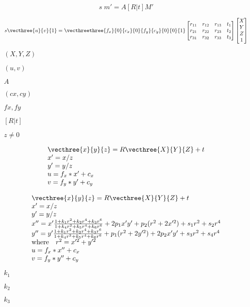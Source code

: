 \documentclass{article}
\begin{document}
\[s \; m' = A [R|t] M'\]
\pagebreak

\[s \vecthree{u}{v}{1} = \vecthreethree{f_x}{0}{c_x}{0}{f_y}{c_y}{0}{0}{1} \begin{bmatrix} r_{11} & r_{12} & r_{13} & t_1 \\ r_{21} & r_{22} & r_{23} & t_2 \\ r_{31} & r_{32} & r_{33} & t_3 \end{bmatrix} \begin{bmatrix} X \\ Y \\ Z \\ 1 \end{bmatrix}\]
\pagebreak

$(X, Y, Z)$
\pagebreak

$(u, v)$
\pagebreak

$A$
\pagebreak

$(cx, cy)$
\pagebreak

$fx, fy$
\pagebreak

$[R|t]$
\pagebreak

$z \ne 0$
\pagebreak

\[\begin{array}{l} \vecthree{x}{y}{z} = R \vecthree{X}{Y}{Z} + t \\ x' = x/z \\ y' = y/z \\ u = f_x*x' + c_x \\ v = f_y*y' + c_y \end{array}\]
\pagebreak

\[\begin{array}{l} \vecthree{x}{y}{z} = R \vecthree{X}{Y}{Z} + t \\ x' = x/z \\ y' = y/z \\ x'' = x' \frac{1 + k_1 r^2 + k_2 r^4 + k_3 r^6}{1 + k_4 r^2 + k_5 r^4 + k_6 r^6} + 2 p_1 x' y' + p_2(r^2 + 2 x'^2) + s_1 r^2 + s_2 r^4 \\ y'' = y' \frac{1 + k_1 r^2 + k_2 r^4 + k_3 r^6}{1 + k_4 r^2 + k_5 r^4 + k_6 r^6} + p_1 (r^2 + 2 y'^2) + 2 p_2 x' y' + s_3 r^2 + s_4 r^4 \\ \text{where} \quad r^2 = x'^2 + y'^2 \\ u = f_x*x'' + c_x \\ v = f_y*y'' + c_y \end{array}\]
\pagebreak

$k_1$
\pagebreak

$k_2$
\pagebreak

$k_3$
\pagebreak
\end{document}
